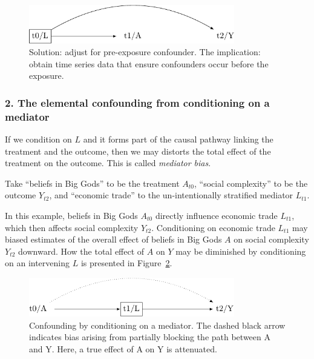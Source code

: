 \documentclass[
  singlecolumn,
  9pt]{article}
\begin{document}
\begin{figure}

{\centering \includegraphics[width=0.8\textwidth,height=\textheight]{causal-dags_files/figure-pdf/fig-dag-common-cause-solution-1.pdf}

}

\caption{\label{fig-dag-common-cause-solution}Solution: adjust for
pre-exposure confounder. The implication: obtain time series data that
ensure confounders occur before the exposure.}

\end{figure}

\subsubsection{2. The elemental confounding from conditioning on a
mediator}\label{the-elemental-confounding-from-conditioning-on-a-mediator}

If we condition on \(L\) and it forms part of the causal pathway linking
the treatment and the outcome, then we may distorts the total effect of
the treatment on the outcome. This is called \emph{mediator bias}.

Take ``beliefs in Big Gods'' to be the treatment \(A_{t0}\), ``social
complexity'' to be the outcome \(Y_{t2}\), and ``economic trade'' to the
un-intentionally stratified mediator \(L_{t1}\).

In this example, beliefs in Big Gods \(A_{t0}\) directly influence
economic trade \(L_{t1}\), which then affects social complexity
\(Y_{t2}\). Conditioning on economic trade \(L_{t1}\) may biased
estimates of the overall effect of beliefs in Big Gods \(A\) on social
complexity \(Y_{t2}\) downward. How the total effect of \(A\) on \(Y\)
may be diminished by conditioning on an intervening \(L\) is presented
in Figure~\ref{fig-dag-mediator}.

\begin{figure}

{\centering \includegraphics[width=0.8\textwidth,height=\textheight]{causal-dags_files/figure-pdf/fig-dag-mediator-1.pdf}

}

\caption{\label{fig-dag-mediator}Confounding by conditioning on a
mediator. The dashed black arrow indicates bias arising from partially
blocking the path between A and Y. Here, a true effect of A on Y is
attenuated.}

\end{figure}
\end{document}
